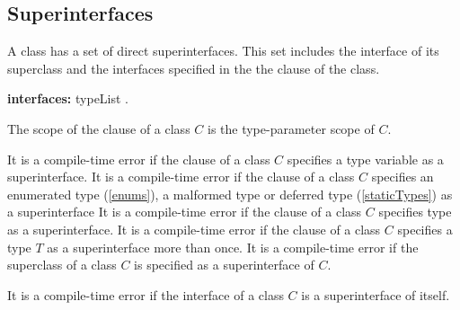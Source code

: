 \documentclass{article}
\begin{document}

\subsection{ Superinterfaces}

\LMHash{}
A class has a set of direct superinterfaces. This set includes the interface of its superclass and the interfaces specified in the the \IMPLEMENTS{}  clause of the class.

\begin{grammar}
{\bf interfaces:}
      \IMPLEMENTS{} typeList
    .
\end{grammar}

\LMHash{}
The scope of the \IMPLEMENTS{} clause of a class $C$ is the type-parameter scope of $C$.

\LMHash{}
It is a compile-time error if  the \IMPLEMENTS{}  clause of a class $C$ specifies a type variable as a superinterface. It is a compile-time error if  the  \IMPLEMENTS{} clause of a class $C$ specifies an enumerated type (\ref{enums}),  a malformed type or deferred type (\ref{staticTypes}) as a superinterface  It is a compile-time error if the \IMPLEMENTS{} clause of a class $C$ specifies type \DYNAMIC{} as a superinterface. It is a compile-time error if  the  \IMPLEMENTS{} clause of a class $C$ specifies  a type $T$ as a superinterface more than once.
It is a compile-time error if the superclass of a class $C$ is specified as a superinterface of $C$.


\LMHash{}
It is a compile-time error if the interface of a class $C$ is a superinterface of itself.
\end{document}

